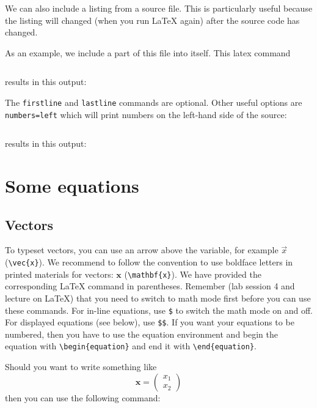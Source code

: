 \documentclass[12pt,a4paper]{article}
\begin{document}
We can also include a listing from a source file. This is particularly
useful because the listing will changed (when you run LaTeX again)
after the source code has changed.

As an example, we include a part of this file into itself. This latex
command
\begin{verbatim}

\end{verbatim}
results in this output:


The \texttt{firstline} and \texttt{lastline} commands are optional.
Other useful options are \texttt{numbers=left} which will print
numbers on the left-hand side of the source:

\begin{verbatim}

\end{verbatim}
results in this output:



\section{Some equations}

\subsection{Vectors}

To typeset vectors, you can use an arrow above the variable, for
example $\vec{x}$ (\verb:\vec{x}:). We recommend to follow the
convention to use boldface letters in printed materials for vectors:
$\mathbf{x}$ (\verb:\mathbf{x}:). We have provided the corresponding
\LaTeX{} command in parentheses. Remember (lab session 4 and lecture
on \LaTeX) that you need to switch to math mode first before you can
use these commands. For in-line equations, use \verb:$: %
to switch the math mode on and off. For displayed equations (see
below), use \verb:$$:. If you want your equations to be numbered, then
you have to use the equation environment and begin the equation with
\verb:\begin{equation}: and end it with \verb:\end{equation}:.
        
Should you want to write something like 
$$ \mathbf{x} = \left( \begin{array}{c} x_1 \\ x_2 \end{array} \right) $$
then you can use the following command:
\end{document}
